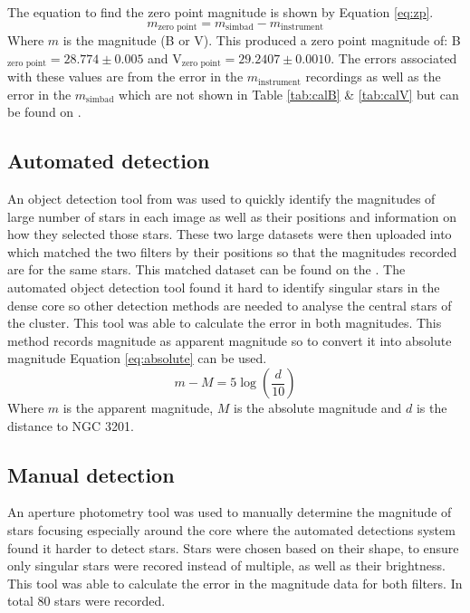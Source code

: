 \documentclass[11pt]{article}
\begin{document}
The equation to find the zero point magnitude is shown by Equation \ref{eq:zp}.
\begin{equation}
	m_{\text{zero point}} = m_{\text{simbad}} - m_{\text{instrument}}
	\label{eq:zp}
\end{equation}
Where $m$ is the magnitude (B or V). This produced a zero point magnitude of: B$_{\text{zero point}} = 28.774 \pm 0.005$ and V$_{\text{zero point}} = 29.2407 \pm 0.0010$. The errors associated with these values are from the error in the $m_{\text{instrument}}$ recordings as well as the error in the $m_{\text{simbad}}$ which are not shown in Table \ref{tab:calB} \& \ref{tab:calV} but can be found on \citet{simbad}. 

\subsection{Automated detection}

An object detection tool from \citet{gaia} was used to quickly identify the magnitudes of large number of stars in each image as well as their positions and information on how they selected those stars. These two large datasets were then uploaded into \citet{topcat} which matched the two filters by their positions so that the magnitudes recorded are for the same stars. This matched dataset can be found on the \citet{github}. The automated object detection tool found it hard to identify singular stars in the dense core so other detection methods are needed to analyse the central stars of the cluster. This tool was able to calculate the error in both magnitudes. This method records magnitude as apparent magnitude so to convert it into absolute magnitude Equation \ref{eq:absolute} can be used.
\begin{equation}
	m-M = 5 \log \left( \frac{d}{10} \right)
	\label{eq:absolute}
\end{equation}
Where $m$ is the apparent magnitude, $M$ is the absolute magnitude and $d$ is the distance to NGC 3201.
\subsection{Manual detection}

An aperture photometry tool was used to manually determine the magnitude of stars focusing especially around the core where the automated detections system found it harder to detect stars. Stars were chosen based on their shape, to ensure only singular stars were recored instead of multiple, as well as their brightness. This tool was able to calculate the error in the magnitude data for both filters. In total 80 stars were recorded.
\end{document}
